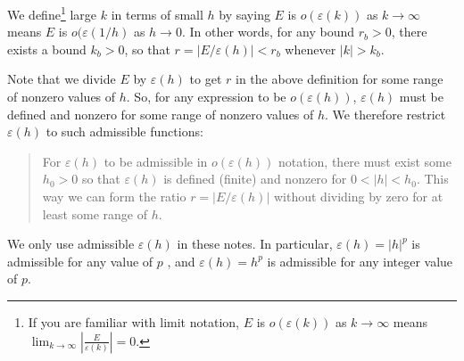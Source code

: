 We define\footnote{If you are familiar with limit notation, $E$ is  $o(\varepsilon(k))$ as $k \rightarrow \infty$ means $\lim_{k\rightarrow \infty} \left|\frac{E}{\varepsilon(k)}\right| = 0$.} large $k$ in terms of small $h$ by saying $E$ is $o(\varepsilon(k))$ as $k \rightarrow \infty$ means $E$ is $o(\varepsilon(1/h)$ as $h \rightarrow 0$.  In other words, for any bound $r_b>0$, there exists a bound $k_b>0$, so that $r=|E/\varepsilon(h)|<r_b$ whenever $|k|>k_b$.
 
Note that we divide $E$ by $\varepsilon(h)$ to get $r$  in the above definition for some range of nonzero values of $h$. So, for any expression to be $o(\varepsilon(h))$,  $\varepsilon(h)$  must be defined and nonzero for some range of nonzero values of $h$.  We therefore restrict $\varepsilon(h)$ to such admissible functions:   

\begin{quote}
For $\varepsilon(h)$ to be admissible in $o(\varepsilon(h))$ notation, there must exist some  $h_0 > 0$ so that $\varepsilon(h)$ is defined (finite) and nonzero for  $0 < |h| < h_0$.  This way we can form the ratio $r=|E/\varepsilon(h)|$ without dividing by zero for at least some range of $h$.
\end{quote}
 
We only use admissible $\varepsilon(h)$ in these notes.  In particular, $\varepsilon(h) = {|h|}^p$  is admissible for any value of  $p$ , and $\varepsilon(h) = h^p$ is admissible for any integer value of $p$.  

